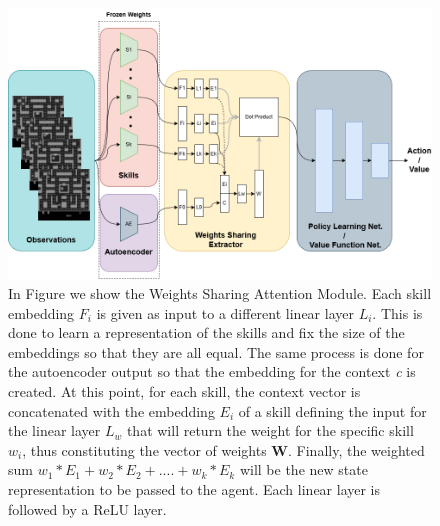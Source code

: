\begin{figure}[ht]
    \begin{center}
        \includegraphics[width=\textwidth]{images/wsharing_module.png}
    \end{center}
    \caption{In Figure we show the Weights Sharing Attention Module. Each skill embedding $F_i$ is given as input to a different linear layer $L_i$. This is done to learn a representation of the skills and fix the size of the embeddings so that they are all equal. The same process is done for the autoencoder output so that the embedding for the context \textit{c} is created. At this point, for each skill, the context vector is concatenated with the embedding $E_i$ of a skill defining the input for the linear layer $L_w$ that will return the weight for the specific skill $w_i$, thus constituting the vector of weights \textbf{W}. Finally, the weighted sum $w_1*E_1 + w_2*E_2 + .... + w_k*E_k$ will be the new state representation to be passed to the agent. Each linear layer is followed by a ReLU layer.}
    \label{fig:wsharingmodule}
\end{figure}